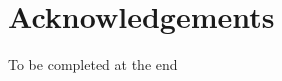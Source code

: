 \documentclass[ %
                    author={James Stephenson},
                supervisor={Dr. Edwin Simpson},
                    degree={MSc},
                     title={Bayesian Deep Learning For Extractive Test Summarisation},
                  subtitle={},
                      type={},
                      year={2023}]{dissertation}
\begin{document}
		
	
	\chapter*{Acknowledgements}
	
		To be completed at the end
		
\end{document}
